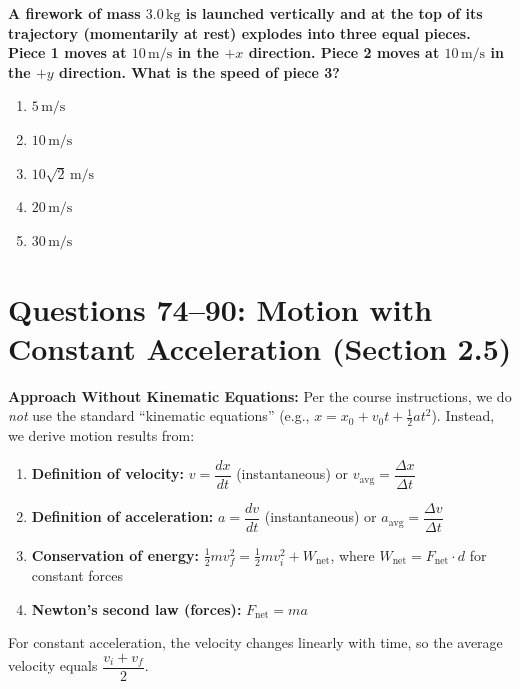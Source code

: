 \documentclass[12pt,letterpaper]{article}
\begin{document}
\begin{questionbox}
\textbf{A firework of mass $3.0\,\text{kg}$ is launched vertically and at the top of its trajectory (momentarily at rest) explodes into three equal pieces. Piece 1 moves at $10\,\text{m/s}$ in the $+x$ direction. Piece 2 moves at $10\,\text{m/s}$ in the $+y$ direction. What is the speed of piece 3?}

\begin{enumerate}[label=\alph*)]
    \item $5\,\text{m/s}$
    \item $10\,\text{m/s}$
    \item $10\sqrt{2}\,\text{m/s}$
    \item $20\,\text{m/s}$
    \item $30\,\text{m/s}$
\end{enumerate}
\end{questionbox}

\section{Questions 74--90: Motion with Constant Acceleration (Section 2.5)}

\begin{conceptbox}
\textbf{Approach Without Kinematic Equations:} Per the course instructions, we do \emph{not} use the standard ``kinematic equations'' (e.g., $x = x_0 + v_0 t + \frac{1}{2}at^2$). Instead, we derive motion results from:

\begin{enumerate}
    \item \textbf{Definition of velocity:} $v = \dfrac{dx}{dt}$ (instantaneous) or $v_{\text{avg}} = \dfrac{\Delta x}{\Delta t}$
    \item \textbf{Definition of acceleration:} $a = \dfrac{dv}{dt}$ (instantaneous) or $a_{\text{avg}} = \dfrac{\Delta v}{\Delta t}$
    \item \textbf{Conservation of energy:} $\frac{1}{2}mv_f^2 = \frac{1}{2}mv_i^2 + W_{\text{net}}$, where $W_{\text{net}} = F_{\text{net}}\cdot d$ for constant forces
    \item \textbf{Newton's second law (forces):} $F_{\text{net}} = ma$
\end{enumerate}

For constant acceleration, the velocity changes linearly with time, so the average velocity equals $\dfrac{v_i + v_f}{2}$.
\end{conceptbox}
\end{document}
